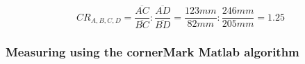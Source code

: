 \documentclass[
a4paper,     %
12pt         %
]{scrartcl}  %
\begin{document}
\hspace{0.5mm}

$$CR_{A,B,C,D} = \frac{\overline{AC}}{\overline{BC}} : \frac{\overline{AD}}{\overline{BD}} = \frac{123mm}{82mm} : \frac{246mm}{205mm} = 1.25$$

\subsubsection{Measuring using the cornerMark Matlab algorithm}





% 

% 
\end{document}
